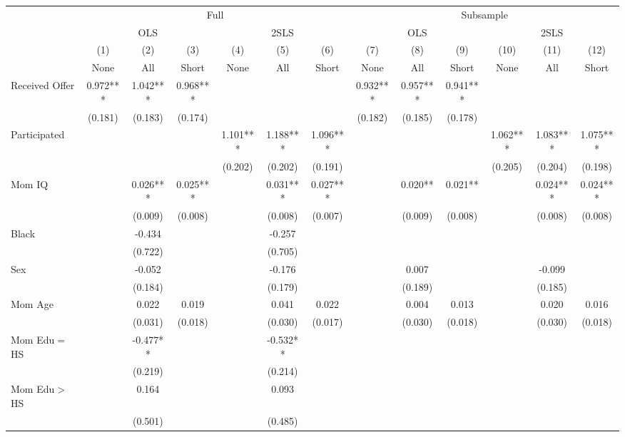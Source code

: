 \begin{tabular}{lcccccccccccc}
\toprule 
\midrule 
 & \multicolumn{6}{c}{Full} & \multicolumn{6}{c}{Subsample} \\
 \cmidrule(lr){2-7} \cmidrule(lr){8-13} 
 & \multicolumn{3}{c}{OLS} & \multicolumn{3}{c}{2SLS} & \multicolumn{3}{c}{OLS} & \multicolumn{3}{c}{2SLS} \\
 \cmidrule(lr){2-4} \cmidrule(lr){5-7} \cmidrule(lr){8-10} \cmidrule(lr){11-13} 
 & (1) & (2) & (3) & (4) & (5) & (6) & (7) & (8) & (9) & (10) & (11) & (12) \\
 & None & All & Short & None & All & Short & None & All & Short & None & All & Short \\
\midrule 
Received Offer & 0.972*** & 1.042*** & 0.968*** &  &  &  & 0.932*** & 0.957*** & 0.941*** &  &  &  \\
 & (0.181) & (0.183) & (0.174) &  &  &  & (0.182) & (0.185) & (0.178) &  &  &  \\
Participated &  &  &  & 1.101*** & 1.188*** & 1.096*** &  &  &  & 1.062*** & 1.083*** & 1.075*** \\
 &  &  &  & (0.202) & (0.202) & (0.191) &  &  &  & (0.205) & (0.204) & (0.198) \\
Mom IQ &  & 0.026*** & 0.025*** &  & 0.031*** & 0.027*** &  & 0.020** & 0.021** &  & 0.024*** & 0.024*** \\
 &  & (0.009) & (0.008) &  & (0.008) & (0.007) &  & (0.009) & (0.008) &  & (0.008) & (0.008) \\
Black &  & -0.434 &  &  & -0.257 &  &  &  &  &  &  &  \\
 &  & (0.722) &  &  & (0.705) &  &  &  &  &  &  &  \\
Sex &  & -0.052 &  &  & -0.176 &  &  & 0.007 &  &  & -0.099 &  \\
 &  & (0.184) &  &  & (0.179) &  &  & (0.189) &  &  & (0.185) &  \\
Mom Age &  & 0.022 & 0.019 &  & 0.041 & 0.022 &  & 0.004 & 0.013 &  & 0.020 & 0.016 \\
 &  & (0.031) & (0.018) &  & (0.030) & (0.017) &  & (0.030) & (0.018) &  & (0.030) & (0.018) \\
Mom Edu$=$HS &  & -0.477** &  &  & -0.532** &  &  &  &  &  &  &  \\
 &  & (0.219) &  &  & (0.214) &  &  &  &  &  &  &  \\
Mom Edu$>$HS &  & 0.164 &  &  & 0.093 &  &  &  &  &  &  &  \\
 &  & (0.501) &  &  & (0.485) &  &  &  &  &  &  &  \\

\end{tabular}
